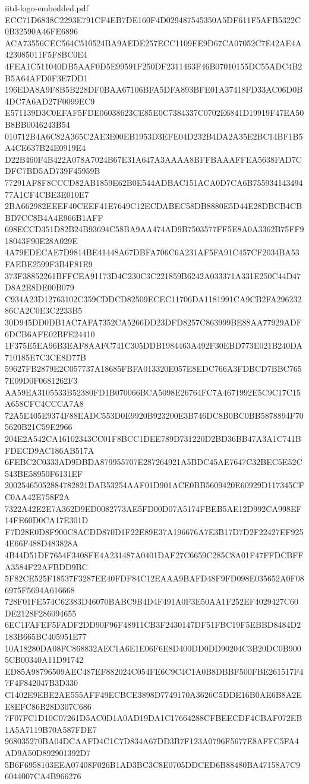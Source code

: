 \begin{filecontents*}[overwrite]{iitd-logo-embedded.pdf}
ECC71D6838C2293E791CF4EB7DE160F4D029487545350A5DF611F5AFB5322C0B32590A46FE6896
ACA73556CEC564C510524BA9AEDE257ECC1109EE9D67CA07052C7E42AE4A423085011F5F8BC0E4
4FEA1C511040DB5AAF0D5E99591F250DF2311463F46B07010155DC55ADC4B2B5A64AFD0F3E7DD1
196EDA8A9F8B5B228DF0BAA67106BFA5DFA893BFE01A37418FD33AC06D0B4DC7A6AD27F0099EC9
E571139D3C0EFAF5FDE06038623CE85E0C7384337C0702E6841D19919F47EA50B8BB0046243B54
010712B4A6C82A365C2AE3E00EB1953D3EFE04D232B4DA2A35E2BC14BF1B5A4CE637B24E0919E4
D22B460F4B422A078A7024B67E31A647A3AAAA8BFFBAAAFFEA5638FAD7CDFC7BD5AD739F45959B
77291AF8F8CCCD82AB1859E62B0E544ADBAC151ACA0D7CA6B75593414349477A1CF4CBE3E010E7
2BA662982EEEF40CEEF41E7649C12ECDABEC58DB8880E5D44E28DBCB4CBBD7CC8B4A4E966B1AFF
698ECCD351D82B24B93694C58BA9AA474AD9B7503577FF5E8A0A3362B75FF918043F90E28A029E
4A79EDECAE7D9814BE41448A67DBFA706C6A231AF5FA91C457CF2034BA53FAEBE2599F3B4F81E9
373F38852261BFFCEA91173D4C230C3C221859B6242A033371A331E250C44D47D8A2E8DE00B079
C934A23D12763102C359CDDCD82509ECEC11706DA1181991CA9CB2FA29623286CA2C0E3C2233B5
30D945DD0DB1AC7AFA7352CA5266DD23DFD8257C863999BE88AA77929ADF6DCB6AFE02BFE24410
1F375E5EA96B3EAF8AAFC741C305DDB1984463A492F30EBD773E021B240DA710185E7C3CE8D77B
59627FB2879E2C057737A18685FBFA013320E057E8EDC766A3FDBCD7BBC7657E09D0F0681262F3
AA59EA3105533B52380FD1B070066BCA5098E26764FC7A4671992E5C9C17C15A658CFC4CCCA7A8
72A5E405E9374F88EADC553D0E9920B923200E3B746DC8B0BC0BB5878894F705620B21C59E2966
204E2A542CA16102343CC01F8BCC1DEE789D731220D2BD36BB47A3A1C741BFDECD9AC186AB517A
6FEBC2C0333AD9DBDA879955707E287264921A5BDC45AE7647C32BEC5E52C543BE58950F6131EF
20025465052884782821DAB53254AAF01D901ACE0BB5609420E60929D117345CFC0AA42E758F2A
7322A42E2E7A362D9ED0082773AE5FD00D07A5174FBEB5AE12D992CA998EF14FE60D0CA17E301D
F7D28E0D8F900C8ACDD870D1F22E89E37A196676A7E3B17D7D2F22427EF9254E66F488D483828A
4B44D51DF7654F3408FE4A231487A0401DAF27C6659C285C8A01F47FFDCBFFA3584F22AFBDD9BC
5F82CE525F18537F3287EE40FDF84C12EAAA9BAFD48F9FD098E035652A0F086975F5694A616668
728F01FE574C62383D46070BABC9B4D4F491A0F3E50AA1F252EF4029427C60DE2128F286094655
6EC1FAFEF5FADF2DD90F96F48911CB3F2430147DF51FBC19F5EBBD8484D2183B665BC405951E77
10A18280DA08FC868832AEC1A6E1E06F6E8D400DD0DD90204C3B20DC0B9005CB00340A11D91742
ED85A98796509AEC487EF882024C054FE6C9C4C1A0B8DBBF500FBE261517F47F4F842047B3D330
C1402E9EBE2AE555AFF49ECBCE3898D7749170A3626C5DDE16B0AE6B8A2EE8EFC86B28D307C686
7F07FC1D10C07261D5AC0D1A0AD19DA1C17664288CFBEECDF4CBAF072EB1A5A7119B70A587FDE7
968035270BA04DCAAFD4C1C7D834A67DD3B7F123A0796F5677E8AFFC5FA4AD9A50D892901392D7
5B6F6958103EEA07408F026B1AD3BC3C8E0705DDCED6B88480BA47158A7C96044007CA4B966276

\end{filecontents*}
